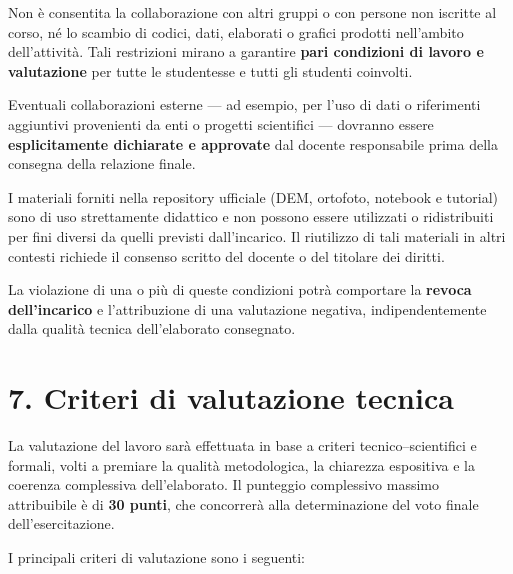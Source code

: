 \documentclass[11pt,a4paper,roman]{moderncv}
\begin{document}
Non è consentita la collaborazione con altri gruppi o con persone non iscritte al corso, né lo scambio di codici, dati, elaborati o grafici prodotti nell’ambito dell’attività.  
Tali restrizioni mirano a garantire \textbf{pari condizioni di lavoro e valutazione} per tutte le studentesse e tutti gli studenti coinvolti.

Eventuali collaborazioni esterne — ad esempio, per l’uso di dati o riferimenti aggiuntivi provenienti da enti o progetti scientifici — dovranno essere \textbf{esplicitamente dichiarate e approvate} dal docente responsabile prima della consegna della relazione finale.

I materiali forniti nella repository ufficiale (DEM, ortofoto, notebook e tutorial) sono di uso strettamente didattico e non possono essere utilizzati o ridistribuiti per fini diversi da quelli previsti dall’incarico.  
Il riutilizzo di tali materiali in altri contesti richiede il consenso scritto del docente o del titolare dei diritti.

La violazione di una o più di queste condizioni potrà comportare la \textbf{revoca dell’incarico} e l’attribuzione di una valutazione negativa, indipendentemente dalla qualità tecnica dell’elaborato consegnato.

\section*{7. Criteri di valutazione tecnica}
La valutazione del lavoro sarà effettuata in base a criteri tecnico–scientifici e formali, volti a premiare la qualità metodologica, la chiarezza espositiva e la coerenza complessiva dell’elaborato.  
Il punteggio complessivo massimo attribuibile è di \textbf{30 punti}, che concorrerà alla determinazione del voto finale dell’esercitazione.

I principali criteri di valutazione sono i seguenti:
\end{document}
